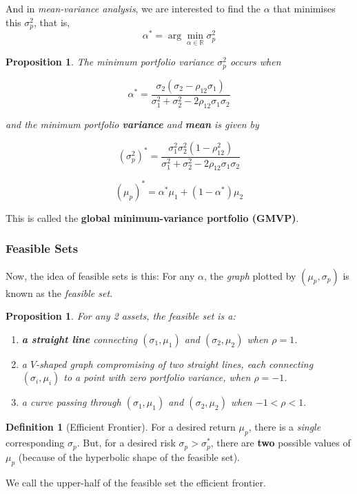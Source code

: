 \documentclass[12pt, a4paper]{article}
\newcommand{\R}{\mathbb{R}}
\theoremstyle{plain}
\newtheorem{proposition}[theorem]{Proposition}
\theoremstyle{definition}
\newtheorem{definition}[theorem]{Definition}
\theoremstyle{remark}
\begin{document}
And in \textit{mean-variance analysis}, we are interested to find the $\alpha$ that minimises this $\sigma_p^2$, that is, $$\alpha^* = \arg \min_{\alpha \in \R} \sigma_p^2$$

\begin{proposition}
    The minimum portfolio variance $\sigma_p^2$ occurs when

    $$\alpha^* = \frac{\sigma_2(\sigma_2- \rho_{12}\sigma_1)}{\sigma_1^2 + \sigma_2^2 -2 \rho_{12} \sigma_1 \sigma_2}$$

    
    and the minimum portfolio \textbf{variance} and \textbf{mean} is given by

    $$(\sigma_p^2)^* = \frac{\sigma_1^2 \sigma_2^2 (1- \rho_{12}^2)}{ \sigma_1^2 + \sigma_2^2 - 2 \rho_{12} \sigma_1 \sigma_2}$$

    $$(\mu_p)^* = \alpha^* \mu_1 + (1- \alpha^*) \mu_2$$
\end{proposition}

This is called the \textbf{global minimum-variance portfolio (GMVP)}.

\subsubsection{Feasible Sets}
Now, the idea of feasible sets is this: For any $\alpha$, the \textit{graph} plotted by $(\mu_p,\sigma_p)$ is known as the \textit{feasible set}.

\begin{proposition}
    For any 2 assets, the feasible set is a:

    \begin{enumerate}
        \item \textbf{a straight line} connecting $(\sigma_1, \mu_1)$ and $(\sigma_2, \mu_2)$ when $\rho=1$.
        \item \textit{a $V$-shaped graph} compromising of two straight lines, each connecting $(\sigma_i, \mu_i)$ to a point with zero portfolio variance, when $\rho =-1$.
        \item \textit{a curve} passing through $(\sigma_1, \mu_1)$ and $(\sigma_2, \mu_2)$ when $-1 < \rho <1.$
    \end{enumerate}
\end{proposition}

\begin{definition}[Efficient Frontier]
    For a desired return $\mu_p$, there is a \textit{single} corresponding $\sigma_p$. But, for a desired risk $\sigma_p> \sigma_p^*$,  there are \textbf{two} possible values of $\mu_p$ (because of the hyperbolic shape of the feasible set).

    \medskip \noindent We call the upper-half of the feasible set the efficient frontier.   
\end{definition}
\end{document}

